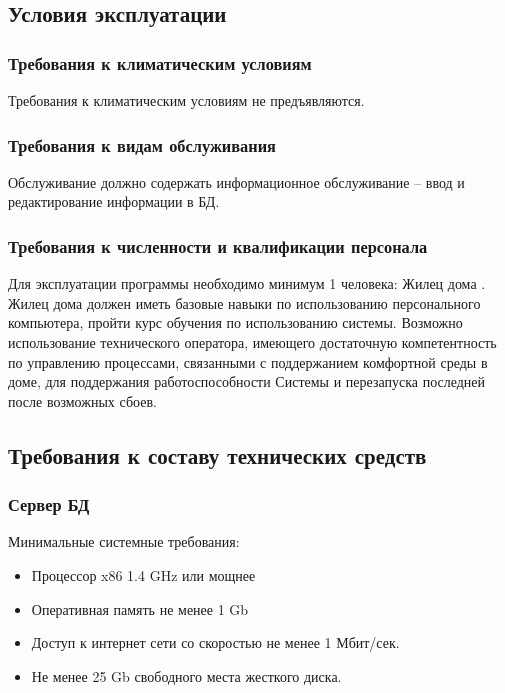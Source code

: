   \subsection{Условия эксплуатации}
    \subsubsection{Требования к климатическим условиям}
      Требования к климатическим условиям не предъявляются.
    \subsubsection{Требования к видам обслуживания}
      Обслуживание должно содержать информационное обслуживание – ввод и редактирование информации в БД.
    \subsubsection{Требования к численности и квалификации персонала}
      Для эксплуатации программы необходимо минимум 1 человека: Жилец дома .
Жилец дома должен иметь базовые навыки по использованию персонального компьютера, пройти курс обучения по использованию системы.
Возможно использование технического оператора, имеющего достаточную компетентность по управлению процессами, связанными с поддержанием комфортной среды в доме, для поддержания работоспособности Системы и перезапуска последней после возможных сбоев.
  \subsection{Требования к составу технических средств}
    \subsubsection{Сервер БД}
      Минимальные системные требования:
      \begin{itemize}
        \item Процессор x86 1.4 GHz или мощнее
        \item Оперативная память не менее 1 Gb
        \item Доступ к интернет сети со скоростью не менее 1 Мбит/сек. 
        \item Не менее 25 Gb свободного места жесткого диска.
      \end{itemize}
